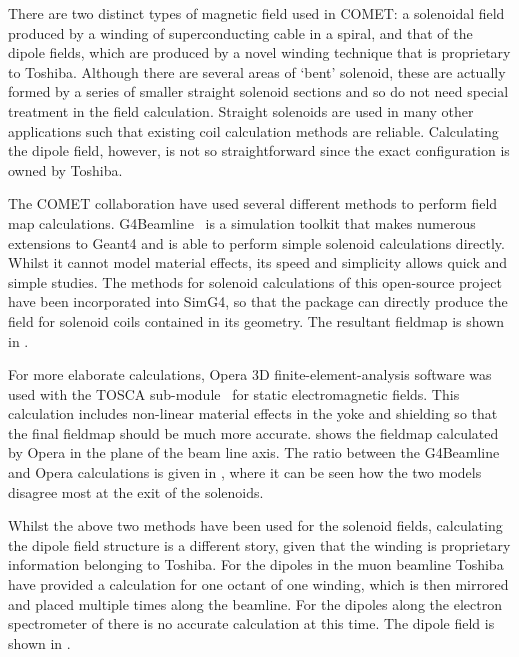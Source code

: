 There are two distinct types of magnetic field used in COMET: a solenoidal field produced by a winding of superconducting cable in a spiral, and that of the dipole fields, which are produced by a novel winding technique that
is proprietary to Toshiba.  
Although there are several areas of `bent' solenoid, these are actually formed by a series of smaller straight solenoid sections and so do not need special treatment in the field calculation.
Straight solenoids are used in many other applications such that existing coil calculation methods are reliable. 
Calculating the dipole field, however, is not so straightforward since the exact configuration is owned by Toshiba.

The COMET collaboration have used several different methods to perform field map calculations.
G4Beamline~\cite{G4Beamline} is a simulation toolkit that makes numerous extensions to Geant4 and is able to perform simple solenoid calculations directly.
Whilst it cannot model material effects, its speed and simplicity allows quick and simple studies. 
The methods for solenoid calculations of this open-source project have been incorporated into SimG4, so that the package can directly produce the field for solenoid coils contained in its geometry.
The resultant fieldmap is shown in .
\FigSoftwareFieldMap
\FigSoftwareFieldMapComparison

For more elaborate calculations, Opera 3D finite-element-analysis software was used with the TOSCA sub-module~\cite{Opera} for static electromagnetic fields.
This calculation includes non-linear material effects in the yoke and shielding so that the final fieldmap should be much more accurate.
 shows the fieldmap calculated by Opera in the plane of the beam line axis.
The ratio between the G4Beamline and Opera calculations is given in , where it can be seen how the two models disagree most at the exit of the solenoids.

\FigSoftwareDipoleField
Whilst the above two methods have been used for the solenoid fields, calculating the dipole field structure is a different story, given that the winding is proprietary information belonging to Toshiba.
For the dipoles in the muon beamline Toshiba have provided a calculation for one octant of one winding, which is then mirrored and placed multiple times along the beamline.
For the dipoles along the electron spectrometer of \phaseII there is no accurate calculation at this time.
The dipole field is shown in .

